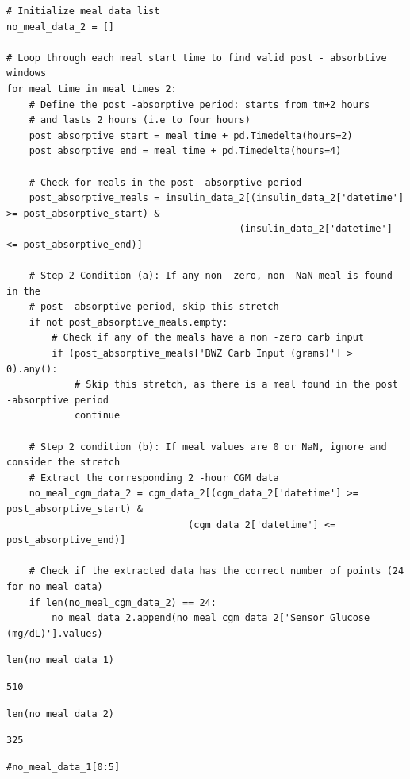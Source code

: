 \begin{verbatim}
# Initialize meal data list
no_meal_data_2 = []
    
# Loop through each meal start time to find valid post - absorbtive windows
for meal_time in meal_times_2:
    # Define the post -absorptive period: starts from tm+2 hours
    # and lasts 2 hours (i.e to four hours)
    post_absorptive_start = meal_time + pd.Timedelta(hours=2)
    post_absorptive_end = meal_time + pd.Timedelta(hours=4)
    
    # Check for meals in the post -absorptive period
    post_absorptive_meals = insulin_data_2[(insulin_data_2['datetime'] >= post_absorptive_start) &
                                         (insulin_data_2['datetime'] <= post_absorptive_end)]
    
    # Step 2 Condition (a): If any non -zero, non -NaN meal is found in the
    # post -absorptive period, skip this stretch
    if not post_absorptive_meals.empty:
        # Check if any of the meals have a non -zero carb input
        if (post_absorptive_meals['BWZ Carb Input (grams)'] > 0).any():
            # Skip this stretch, as there is a meal found in the post -absorptive period
            continue
    
    # Step 2 condition (b): If meal values are 0 or NaN, ignore and consider the stretch
    # Extract the corresponding 2 -hour CGM data
    no_meal_cgm_data_2 = cgm_data_2[(cgm_data_2['datetime'] >= post_absorptive_start) & 
                                (cgm_data_2['datetime'] <= post_absorptive_end)]
    
    # Check if the extracted data has the correct number of points (24 for no meal data)
    if len(no_meal_cgm_data_2) == 24:
        no_meal_data_2.append(no_meal_cgm_data_2['Sensor Glucose (mg/dL)'].values)
\end{verbatim}

\begin{verbatim}
len(no_meal_data_1)
\end{verbatim}

\begin{verbatim}
510
\end{verbatim}

\begin{verbatim}
len(no_meal_data_2)
\end{verbatim}

\begin{verbatim}
325
\end{verbatim}

\begin{verbatim}
#no_meal_data_1[0:5]
\end{verbatim}

